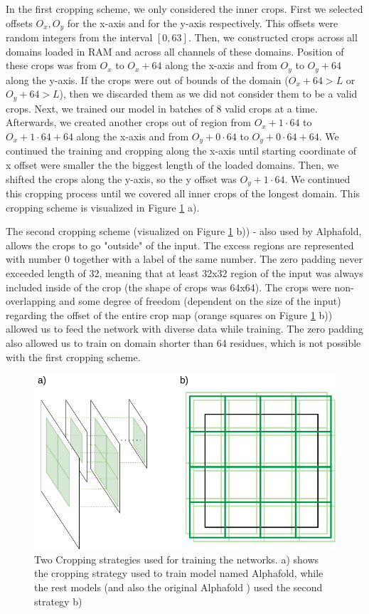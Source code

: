 In the first cropping scheme, we only considered the inner crops.
First we selected offsets $O_x, O_y$ for the x-axis and for the y-axis respectively. 
This offsets were random integers from the interval $[0, 63]$.
Then, we constructed crops across all domains loaded in RAM and across all channels of these domains.
Position of these crops was from $O_x$ to $O_x + 64$ along the x-axis and from $O_y$ to $O_y + 64$ along the y-axis.
If the crops were out of bounds of the domain ($O_x + 64 > L$ or $O_y + 64 > L$), then we discarded them as we did not consider them to be a valid crops.
Next, we trained our model in batches of 8 valid crops at a time.
Afterwards, we created another crops out of region from $O_x + 1 \cdot 64$ to $O_x + 1 \cdot 64 + 64$ along the x-axis and from $O_y + 0 \cdot 64$ to $O_y + 0 \cdot 64 + 64$.
We continued the training and cropping along the x-axis until starting coordinate of x offset were smaller the the biggest length of the loaded domains.
Then, we shifted the crops along the y-axis, so the y offset was $O_y + 1 \cdot 64$.
We continued this cropping process until we covered all inner crops of the longest domain.
This cropping scheme is visualized in Figure \ref{fig:cropping} a).

The second cropping scheme (visualized on Figure \ref{fig:cropping} b)) - also used by Alphafold, allows the crops to go "outside" of the input. The excess regions are represented with number 0 together with a label of the same number. The zero padding never exceeded length of 32, meaning that at least 32x32 region of the input was always included inside of the crop (the shape of crops was 64x64). The crops were non-overlapping and some degree of freedom (dependent on the size of the input) regarding the offset of the entire crop map (orange squares on Figure \ref{fig:cropping} b)) allowed us to feed the network with diverse data while training. The zero padding also allowed us to train on domain shorter than 64 residues, which is not possible with the first cropping scheme.

\begin{figure}
    \centering
    \includegraphics[width=\linewidth]{imgs_tomas/cropping_schemes.png}
    \caption{Two Cropping strategies used for training the networks. a) shows the cropping strategy used to train model named Alphafold, while the rest models (and also the original Alphafold \cite{alphafold}) used the second strategy b)}
    \label{fig:cropping}
\end{figure}


